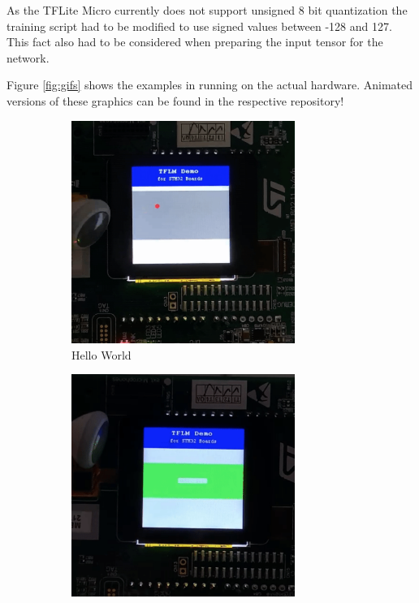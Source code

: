 \documentclass[oneside]{tum-book}
\begin{document}
As the TFLite Micro currently does not support unsigned 8 bit quantization the training script had to be modified to use signed values between -128 and 127. This fact also had to be considered when preparing the input tensor for the network.

Figure \ref{fig:gifs} shows the examples in running on the actual hardware. Animated versions of these graphics can be found in the respective repository!

\begin{figure}[h]
     \centering
     \begin{subfigure}[b]{0.3\textwidth}
         \centering
         \includegraphics[width=0.8\textwidth]{figures/hello_world_gif.png}
         \caption{Hello World}
         \label{fig:gif_hello_world}
     \end{subfigure}
     \hfill
     \begin{subfigure}[b]{0.3\textwidth}
         \centering
         \includegraphics[width=0.8\textwidth]{figures/micro_speech_gif.png}

\end{subfigure}
\end{figure}
\end{document}
